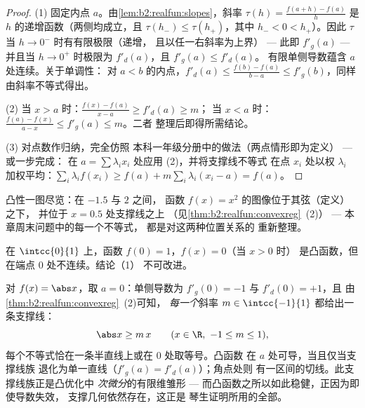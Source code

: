 \begin{proof}
(1) 固定内点 $a$。由\cref{lem:b2:realfun:slopes}，斜率
$\tau(h) = \frac{f(a + h) - f(a)}{h}$ 是
$h$ 的递增函数（两侧均成立，且 $\tau(h_-) \leq \tau(h_+)$，其中 $h_- < 0 <
h_+$）。因此 $\tau$ 当 $h \to 0^-$ 时有有限极限（递增，
且以任一右斜率为上界） --- 此即 $f'_g(a)$ --- 并且当
$h \to 0^+$ 时极限为 $f'_d(a)$，且 $f'_g(a) \leq f'_d(a)$。
有限单侧导数蕴含 $a$ 处连续。关于单调性：
对 $a < b$ 的内点，$f'_d(a) \leq \frac{f(b) - f(a)}{b -
a} \leq f'_g(b)$，同样由斜率不等式得出。

(2) 当 $x > a$ 时：$\frac{f(x) - f(a)}{x - a} \geq f'_d(a) \geq m$；
当 $x < a$ 时：$\frac{f(a) - f(x)}{a - x} \leq f'_g(a) \leq m$。二者
整理后即得所需结论。

(3) 对点数作归纳，完全仿照
本科一年级分册中的做法（两点情形即为定义） --- 或一步完成：
在 $a = \sum\lambda_i x_i$ 处应用 (2)，并将支撑线不等式
在点 $x_i$ 处以权 $\lambda_i$ 加权平均：$\sum_i
\lambda_i f(x_i) \geq f(a) + m\sum_i\lambda_i(x_i - a) = f(a)$。
\end{proof}

\begin{omfigure}

{\small 凸性一图尽览：在 $-1.5$ 与 $2$ 之间，
函数 $f(x) = x^2$ 的图像位于其弦（定义）之下，
并位于 $x = 0.5$ 处支撑线之上
（见\cref{thm:b2:realfun:convexreg}~(2)） --- 本章周末问题中的每一个不等式，
都是对这两种位置关系的
重新整理。}
\end{omfigure}

\begin{example}[端点处的不连续]
在 $\intcc{0}{1}$ 上，函数 $f(0) = 1$，$f(x) = 0$（当 $x > 0$ 时）
是凸函数，但在端点 $0$ 处不连续。结论（1）
不可改进。
\end{example}

\begin{example}[角点与支撑线族]\label{ex:b2:realfun:corner}
对 $f(x) = \abs x$，取 $a = 0$：单侧导数为
$f'_g(0) = -1$ 与 $f'_d(0) = +1$，且
由\cref{thm:b2:realfun:convexreg}~(2)可知，
\emph{每一个}斜率 $m \in \intcc{-1}{1}$ 都给出一条支撑线：
\[
\abs x \geq m\,x \qquad (x \in \R,\ -1 \leq m \leq 1),
\]
每个不等式恰在一条半直线上或在 $0$ 处取等号。凸函数
在 $a$ 处可导，当且仅当支撑线族
退化为单一直线（$f'_g(a) = f'_d(a)$）；角点处则
有一区间的切线。此支撑线族正是凸优化中
\emph{次微分}的有限维雏形 ---
而凸函数之所以如此稳健，正因为即使导数失效，
支撑几何依然存在，这正是
琴生证明所用的全部。
\end{example}

